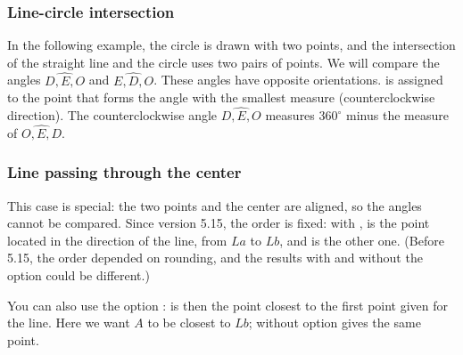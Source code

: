 \subsubsection{Line-circle intersection}

In the following example, the circle is drawn with two points, and the intersection of the straight line and the circle uses two pairs of points. We will compare the angles $\widehat{D,E,O}$ and $\widehat{E,D,O}$. These angles have opposite orientations.  is assigned to the point that forms the angle with the smallest measure (counterclockwise direction). The counterclockwise angle $\widehat{D,E,O}$ measures $360^\circ$ minus the measure of $\widehat{O,E,D}$.

\begin{tkzexample}[latex=7cm,small]
\end{tkzexample}

\subsubsection{Line passing through the center}\label{interLC-center}
This case is special: the two points and the center are aligned, so the angles cannot be compared. Since version 5.15, the order is fixed: with ,  is the point located in the direction of the line, from $La$ to $Lb$, and  is the other one. (Before 5.15, the order depended on rounding, and the results with and without the option  could be different.)

You can also use the option :  is then the point closest to the first point given for the line. Here we want $A$ to be closest to $Lb$;  without option gives the same point.

\begin{tkzexample}[latex=8cm,small]
\end{tkzexample}

